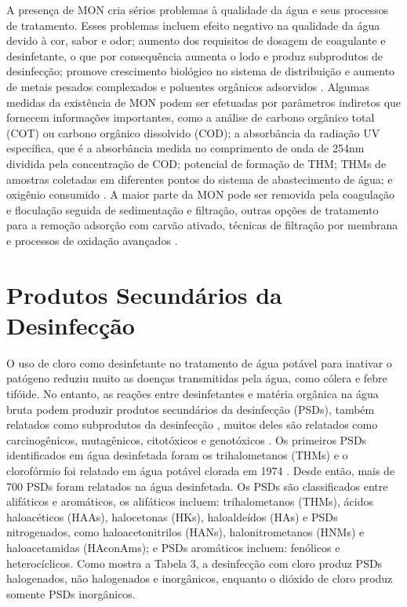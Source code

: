 A presença de MON cria sérios problemas à qualidade da água e seus processos de tratamento. Esses problemas incluem efeito negativo na qualidade da água devido à cor, sabor e odor; aumento dos requisitos de dosagem de coagulante e desinfetante, o que por consequência aumenta o lodo e produz subprodutos de desinfecção; promove crescimento biológico no sistema de distribuição e aumento de metais pesados complexados e poluentes orgânicos adsorvidos \cite{mon1995}. Algumas medidas da existência de MON podem ser efetuadas por parâmetros indiretos que fornecem informações importantes, como a análise de carbono orgânico total (COT) ou carbono orgânico dissolvido (COD); a absorbância da radiação UV específica, que é a absorbância medida no comprimento de onda de 254nm dividida pela concentração de COD; potencial de formação de THM; THMs de amostras coletadas em diferentes pontos do sistema de abastecimento de água; e oxigênio consumido \cite{dibernardo2017}. A maior parte da MON pode ser removida pela coagulação e floculação seguida de sedimentação e filtração, outras opções de tratamento para a remoção adsorção com carvão ativado, técnicas de filtração por membrana e processos de oxidação avançados \cite{mon1995}.






\section{Produtos Secundários da Desinfecção}

O uso de cloro como desinfetante no tratamento de água potável para inativar o patógeno reduziu muito as doenças transmitidas pela água, como cólera e febre tifóide. No entanto, as reações entre desinfetantes e matéria orgânica na água bruta podem produzir produtos secundários da desinfecção (PSDs), também relatados como subprodutos da desinfecção \cite{Abbas2014}, muitos deles são relatados como carcinogênicos, mutagênicos, citotóxicos e genotóxicos \cite{benson2017disinfection}. Os primeiros PSDs identificados em água desinfetada foram os trihalometanos (THMs) \cite{bellar1974occurrence} e o clorofórmio foi relatado em água potável clorada em 1974 \cite{rook1974}. Desde então, mais de 700 PSDs foram relatados na água desinfetada. Os PSDs são classificados entre alifáticos e aromáticos, os alifáticos incluem: trihalometanos (THMs), ácidos haloacéticos (HAAs), halocetonas (HKs), haloaldeídos (HAs) e PSDs nitrogenados, como haloacetonitrilos (HANs), halonitrometanos (HNMs) e haloacetamidas (HAconAms); e PSDs aromáticos incluem: fenólicos e heterocíclicos. Como mostra a Tabela 3, a desinfecção com cloro produz PSDs halogenados, não halogenados e inorgânicos, enquanto o dióxido de cloro produz somente PSDs inorgânicos.


